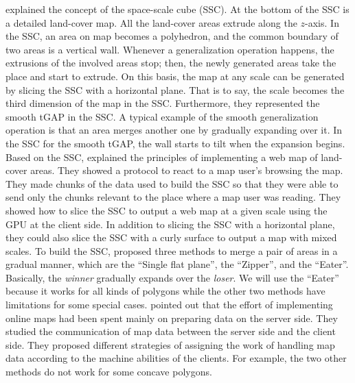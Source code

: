 \documentclass[ijgi,article,submit,moreauthors,pdftex]{Definitions/mdpi}
\begin{document}
\citet{vanOosterom2014Support} explained the concept of the space-scale cube (SSC).
At the bottom of the SSC is a detailed land-cover map.
All the land-cover areas extrude along the $z$-axis.
In the SSC, an area on map becomes a polyhedron, and
the common boundary of two areas is a vertical wall.
Whenever a generalization operation happens, 
the extrusions of the involved areas stop;
then, the newly generated areas take the place and start to extrude.
On this basis, the map at any scale can be generated by slicing the SSC 
with a horizontal plane.
That is to say, the scale becomes the third dimension of the map in the SSC.
Furthermore, they represented the smooth tGAP in the SSC.
A typical example of the smooth generalization operation is that 
an area merges another one by gradually expanding over it.
In the SSC for the smooth tGAP, 
the wall starts to tilt when the expansion begins.
Based on the SSC, \citet{Meijers2020Web} explained the principles of 
implementing a web map of land-cover areas.
They showed a protocol to react to a map user's browsing the map.
They made chunks of the data used to build the SSC
so that they were able to send only the chunks relevant to the place
where a map user was reading.
They showed how to slice the SSC to output a web map at a given scale 
using the GPU at the client side.
In addition to slicing the SSC with a horizontal plane,
they could also slice the SSC with a curly surface 
to output a map with mixed scales.
To build the SSC, \citet{Suba2014Merge} proposed three methods 
to merge a pair of areas in a gradual manner, 
which are the ``Single flat plane'', the ``Zipper'', and the ``Eater''.
Basically, the \emph{winner} gradually expands over the \emph{loser}.
We will use the ``Eater'' because it works for all kinds of polygons 
while the other two methods have limitations for some special cases.
\citet{Huang2016Webmap} pointed out that
the effort of implementing online maps 
had been spent mainly on preparing data on the server side.
They studied the communication of map data 
between the server side and the client side.
They proposed different strategies of assigning 
the work of handling map data
according to the machine abilities of the clients.
For example, the two other methods do not work for some concave polygons.
\end{document}
